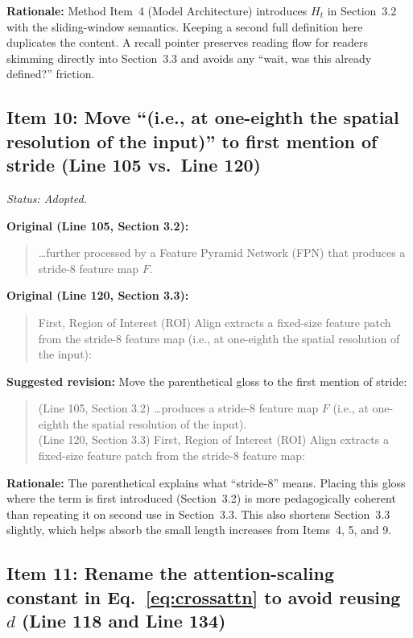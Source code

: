 \documentclass{article}
\begin{document}
\textbf{Rationale:}
Method Item~4 (Model Architecture) introduces $H_t$ in Section~3.2 with the sliding-window semantics. Keeping a second full definition here duplicates the content. A recall pointer preserves reading flow for readers skimming directly into Section~3.3 and avoids any ``wait, was this already defined?'' friction.

\subsection*{Item 10: Move ``(i.e., at one-eighth the spatial resolution of the input)'' to first mention of stride (Line 105 vs.\ Line 120)}

\textit{Status: Adopted.}

\textbf{Original (Line 105, Section 3.2):}
\begin{quote}
\ldots further processed by a Feature Pyramid Network (FPN) that produces a stride-8 feature map $F$.
\end{quote}

\textbf{Original (Line 120, Section 3.3):}
\begin{quote}
First, Region of Interest (ROI) Align \cite{he2017mask} extracts a fixed-size feature patch from the stride-8 feature map (i.e., at one-eighth the spatial resolution of the input):
\end{quote}

\textbf{Suggested revision:}
Move the parenthetical gloss to the first mention of stride:
\begin{quote}
(Line 105, Section 3.2) \ldots produces a stride-8 feature map $F$ (i.e., at one-eighth the spatial resolution of the input).\\
(Line 120, Section 3.3) First, Region of Interest (ROI) Align \cite{he2017mask} extracts a fixed-size feature patch from the stride-8 feature map:
\end{quote}

\textbf{Rationale:}
The parenthetical explains what ``stride-8'' means. Placing this gloss where the term is first introduced (Section~3.2) is more pedagogically coherent than repeating it on second use in Section~3.3. This also shortens Section~3.3 slightly, which helps absorb the small length increases from Items~4, 5, and 9.

\subsection*{Item 11: Rename the attention-scaling constant in Eq.~\ref{eq:crossattn} to avoid reusing $d$ (Line 118 and Line 134)}
\end{document}
